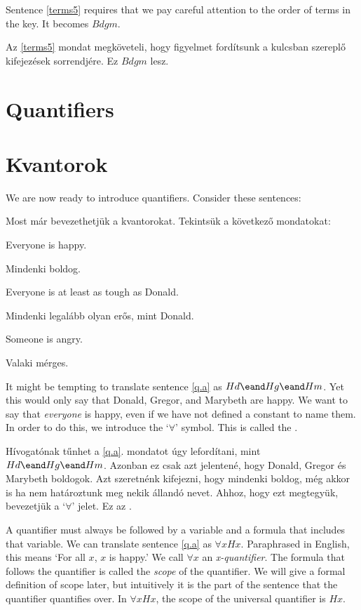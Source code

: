 Sentence \ref{terms5} requires that we pay careful attention to the order of terms in the key. It becomes $Bdgm$.

Az \ref{terms5} mondat megköveteli, hogy figyelmet fordítsunk a kulcsban szereplő kifejezések sorrendjére. Ez $Bdgm$ lesz.



\section*{Quantifiers}
\section{Kvantorok}
We are now ready to introduce quantifiers. Consider these sentences:

Most már bevezethetjük a kvantorokat. Tekintsük a következő mondatokat:

\begin{earg}
\item[\ex{q.a}] Everyone is happy.
\item[\ex{q.a}] Mindenki boldog.
\item[\ex{q.ac}] Everyone is at least as tough as Donald.
\item[\ex{q.ac}] Mindenki legalább olyan erős, mint Donald.
\item[\ex{q.e}] Someone is angry.
\item[\ex{q.e}] Valaki mérges.
\end{earg}

It might be tempting to translate sentence \ref{q.a} as $Hd \eand Hg \eand Hm$. Yet this would only say that Donald, Gregor, and Marybeth are happy. We want to say that \emph{everyone} is happy, even if we have not defined a constant to name them. In order to do this, we introduce the `$\forall$' symbol. This is called the .

Hívogatónak tűnhet a \ref{q.a}. mondatot úgy lefordítani, mint $Hd \eand Hg \eand Hm$. Azonban ez csak azt jelentené, hogy Donald, Gregor és Marybeth boldogok. Azt szeretnénk kifejezni, hogy mindenki boldog, még akkor is ha nem határoztunk meg nekik állandó nevet. Ahhoz, hogy ezt megtegyük, bevezetjük a `$\forall$' jelet. Ez az .

A quantifier must always be followed by a variable and a formula that includes that variable. We can translate sentence \ref{q.a} as $\forall x Hx$. Paraphrased in English, this means `For all $x$, $x$ is happy.'
We call $\forall x$ an \emph{x-quantifier}. The formula that follows the quantifier is called the \emph{scope} of the quantifier. We will give a formal definition of scope later, but intuitively it is the part of the sentence that the quantifier quantifies over. In $\forall x Hx$, the scope of the universal quantifier is $Hx$.

